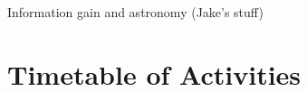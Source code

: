 \documentclass[useAMS,usenatbib,tightenlines,11pt,preprint]{aastex}
\begin{document}




Information gain and astronomy (Jake's stuff)

\section{Timetable of Activities}
\end{document}
